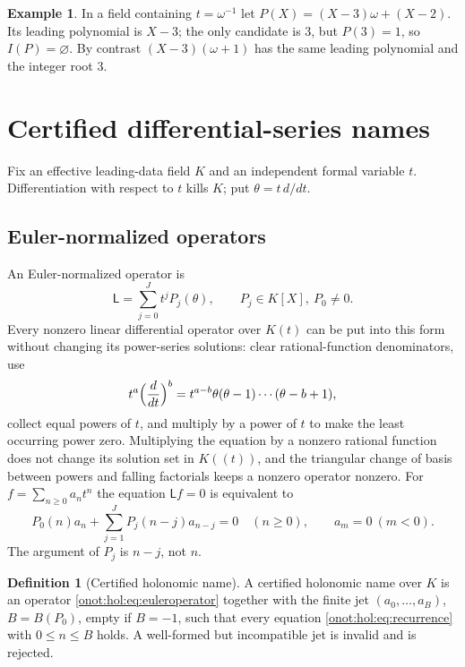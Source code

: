 \documentclass[11pt,oneside]{article}
\numberwithin{equation}{section}
\theoremstyle{definition}
\newtheorem{definition}[definition]{Definition}
\newtheorem{example}[example]{Example}
\theoremstyle{remark}
\begin{document}
\begin{example}\label{onot:hol:ex:integerroot}
In a field containing $t=\omega^{-1}$ let $P(X)=(X-3)\omega+(X-2)$. Its leading
polynomial is $X-3$; the only candidate is $3$, but $P(3)=1$, so
$I(P)=\varnothing$. By contrast $(X-3)(\omega+1)$ has the same leading polynomial
and the integer root $3$.
\end{example}

\section{Certified differential-series names}\label{onot:hol:sec:certificates}

Fix an effective leading-data field $K$ and an independent formal variable $t$.
Differentiation with respect to $t$ kills $K$; put $\theta=t\,d/dt$.

\subsection{Euler-normalized operators}

An Euler-normalized operator is
\begin{equation}\label{onot:hol:eq:euleroperator}
 \mathsf L=\sum_{j=0}^Jt^jP_j(\theta),\qquad P_j\in K[X],\ P_0\ne0.
\end{equation}
Every nonzero linear differential operator over $K(t)$ can be put into this form
without changing its power-series solutions: clear rational-function
denominators, use
\begin{equation}\label{onot:hol:eq:falling}
 t^a\Bigl(\frac d{dt}\Bigr)^b=t^{a-b}\theta(\theta-1)\cdots(\theta-b+1),
\end{equation}
collect equal powers of $t$, and multiply by a power of $t$ to make the least
occurring power zero. Multiplying the equation by a nonzero rational function
does not change its solution set in $K((t))$, and the triangular change of basis
between powers and falling factorials keeps a nonzero operator nonzero. For
$f=\sum_{n\ge0}a_nt^n$ the equation $\mathsf Lf=0$ is equivalent to
\begin{equation}\label{onot:hol:eq:recurrence}
 P_0(n)a_n+\sum_{j=1}^JP_j(n-j)a_{n-j}=0\quad(n\ge0),\qquad a_m=0\ (m<0).
\end{equation}
The argument of $P_j$ is $n-j$, not $n$.

\begin{definition}[Certified holonomic name]\label{onot:hol:def:certificate}
A certified holonomic name over $K$ is an operator
\eqref{onot:hol:eq:euleroperator} together with the finite jet
$(a_0,\ldots,a_B)$, $B=B(P_0)$, empty if $B=-1$, such that every equation
\eqref{onot:hol:eq:recurrence} with $0\le n\le B$ holds. A well-formed but
incompatible jet is invalid and is rejected.
\end{definition}
\end{document}
